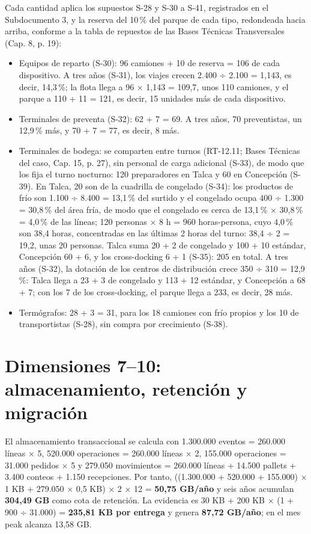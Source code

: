 Cada cantidad aplica los supuestos S-28 y S-30 a S-41, registrados en el Subdocumento 3, y la reserva del 10\,\% del parque de cada tipo, redondeada hacia arriba, conforme a la tabla de repuestos de las Bases Técnicas Transversales (Cap. 8, p. 19):

\begin{itemize}
  \item Equipos de reparto (S-30): 96 camiones + 10 de reserva = 106 de cada dispositivo. A tres años (S-31), los viajes crecen 2.400 ÷ 2.100 = 1,143, es decir, 14,3\,\%; la flota llega a 96 × 1,143 = 109,7, unos 110 camiones, y el parque a 110 + 11 = 121, es decir, 15 unidades más de cada dispositivo.
  \item Terminales de preventa (S-32): 62 + 7 = 69. A tres años, 70 preventistas, un 12,9\,\% más, y 70 + 7 = 77, es decir, 8 más.
  \item Terminales de bodega: se comparten entre turnos (RT-12.11; Bases Técnicas del caso, Cap. 15, p. 27), sin personal de carga adicional (S-33), de modo que los fija el turno nocturno: 120 preparadores en Talca y 60 en Concepción (S-39). En Talca, 20 son de la cuadrilla de congelado (S-34): los productos de frío son 1.100 ÷ 8.400 = 13,1\,\% del surtido y el congelado ocupa 400 ÷ 1.300 = 30,8\,\% del área fría, de modo que el congelado es cerca de 13,1\,\% × 30,8\,\% = 4,0\,\% de las líneas; 120 personas × 8 h = 960 horas-persona, cuyo 4,0\,\% son 38,4 horas, concentradas en las últimas 2 horas del turno: 38,4 ÷ 2 = 19,2, unas 20 personas. Talca suma 20 + 2 de congelado y 100 + 10 estándar, Concepción 60 + 6, y los cross-docking 6 + 1 (S-35): 205 en total. A tres años (S-32), la dotación de los centros de distribución crece 350 ÷ 310 = 12,9\,\%: Talca llega a 23 + 3 de congelado y 113 + 12 estándar, y Concepción a 68 + 7; con los 7 de los cross-docking, el parque llega a 233, es decir, 28 más.
  \item Termógrafos: 28 + 3 = 31, para los 18 camiones con frío propios y los 10 de transportistas (S-28), sin compra por crecimiento (S-38).
\end{itemize}

\section{Dimensiones 7--10: almacenamiento, retención y migración}
\label{sec:anexo-4b-dimensiones-7-10}

El almacenamiento transaccional se calcula con 1.300.000 eventos = 260.000 líneas × 5, 520.000 operaciones = 260.000 líneas × 2, 155.000 operaciones = 31.000 pedidos × 5 y 279.050 movimientos = 260.000 líneas + 14.500 pallets + 3.400 conteos + 1.150 recepciones. Por tanto, ((1.300.000 + 520.000 + 155.000) × 1 KB + 279.050 × 0,5 KB) × 2 × 12 = \textbf{50,75 GB/año} y seis años acumulan \textbf{304,49 GB} como cota de retención. La evidencia es 30 KB + 200 KB × (1 + 900 ÷ 31.000) = \textbf{235,81 KB por entrega} y genera \textbf{87,72 GB/año}; en el mes peak alcanza 13,58 GB.

